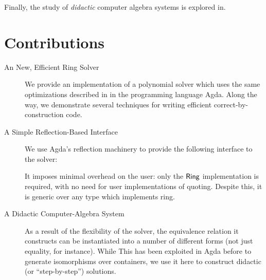 \documentclass[draft, twocolumn]{article}
\theoremstyle{definition}
\theoremstyle{remark}
\begin{document}
Finally, the study of \emph{didactic} computer algebra systems is explored
in\cite{lioubartsev_constructing_2016}.
\section{Contributions}
\begin{description}
  \item[An New, Efficient Ring Solver]
    We provide an implementation of a polynomial solver which uses the same
    optimizations described in\cite{gregoire_proving_2005} in the programming
    language Agda. Along the way, we demonstrate several techniques for writing
    efficient correct-by-construction code.
  \item[A Simple Reflection-Based Interface] We use Agda's reflection machinery
    to provide the following interface to the solver:


    It imposes minimal overhead on the user: only the \(\AgdaDatatype{Ring}\)
    implementation is required, with no need for user implementations of
    quoting. Despite this, it is generic over any type which implements ring.
  \item[A Didactic Computer-Algebra System] As a result of the flexibility of
    the solver, the equivalence relation it constructs can be instantiated into
    a number of different forms (not just equality, for instance). While This
    has been exploited in Agda before to generate isomorphisms over containers,
    we use it here to construct didactic (or ``step-by-step'') solutions.
\end{description}


\end{document}
